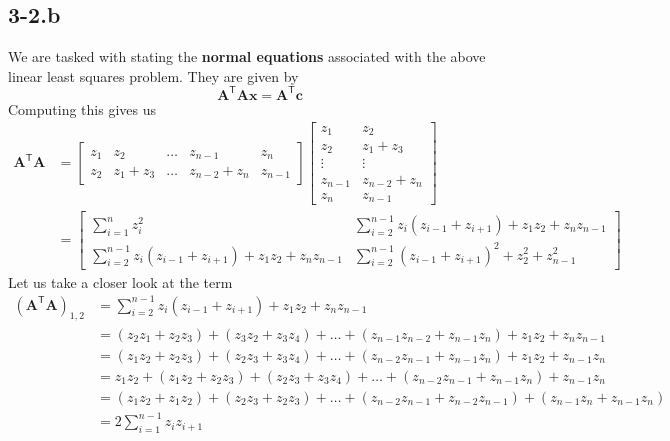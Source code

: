 \documentclass{article}
\begin{document}
\subsection*{3-2.b}
We are tasked with stating the \textbf{normal equations} associated with the above linear least squares problem. They are given by
\begin{equation*}
    \mathbf{A}^{\mathsf{T}}\mathbf{A}\mathbf{x} = \mathbf{A}^{\mathsf{T}}\mathbf{c}
\end{equation*}
Computing this gives us
\begin{align*}
   \mathbf{A}^{\mathsf{T}}\mathbf{A} &=  
   \begin{bmatrix}
        z_{1} & z_{2} & \dots & z_{n-1} & z_{n} \\
        z_{2} & z_{1} + z_{3} & \dots& z_{n-2} + z_{n} & z_{n-1}
    \end{bmatrix}
   \begin{bmatrix}
        z_{1} & z_{2} \\
         z_{2} & z_{1} +z_{3} \\
         \vdots & \vdots \\
         z_{n-1} & z_{n-2} + z_{n} \\
         z_{n} & z_{n-1}
    \end{bmatrix} \\
    &= 
    \begin{bmatrix}
        \sum_{i=1}^{n}z_{i}^{2} & \sum_{i =2}^{n-1}z_{i}\left(z_{i-1} + z_{i+1}\right) + z_{1}z_{2} + z_{n}z_{n-1} \\[1mm]
        \sum_{i =2}^{n-1}z_{i}\left(z_{i-1} + z_{i+1}\right) + z_{1}z_{2} + z_{n}z_{n-1} & \sum_{i=2}^{n-1}\left(z_{i-1} +  z_{i + 1}\right)^{2} + z_{2}^{2} + z_{n-1}^{2}
    \end{bmatrix}
\end{align*}
\noindent Let us take a closer look at the term
\begin{align*}
\left(\mathbf{A}^{\mathsf{T}}\mathbf{A}\right)_{1,2} &=  
    \sum_{i =2}^{n-1}z_{i}\left(z_{i-1} + z_{i+1}\right) + z_{1}z_{2} + z_{n}z_{n-1} \\
    &= \left(z_{2}z_{1} + z_{2}z_{3}\right) +\left(z_{3}z_{2} + z_{3}z_{4}\right) + \dots + \left(z_{n-1}z_{n-2} + z_{n-1}z_{n}\right) + z_{1}z_{2} + z_{n}z_{n-1} \\
    &=\left(z_{1}z_{2} + z_{2}z_{3}\right) +\left(z_{2}z_{3} + z_{3}z_{4}\right) + \dots + \left(z_{n-2}z_{n-1} + z_{n-1}z_{n}\right) + z_{1}z_{2} + z_{n-1}z_{n} \\
    &=z_{1}z_{2}  +
    \left(z_{1}z_{2} + z_{2}z_{3}\right) +\left(z_{2}z_{3} + z_{3}z_{4}\right) + \dots + \left(z_{n-2}z_{n-1} + z_{n-1}z_{n}\right) +  z_{n-1}z_{n} \\
    &= \left(z_{1}z_{2}  +
    z_{1}z_{2}\right) + \left(z_{2}z_{3} + z_{2}z_{3}\right) + \dots + \left(z_{n-2}z_{n-1} + z_{n-2}z_{n-1}\right) +  \left(z_{n-1}z_{n} 
 + z_{n-1}z_{n} \right)\\
 &= 2\sum_{i=1}^{n-1}z_{i}z_{i+1}
\end{align*}
\end{document}
